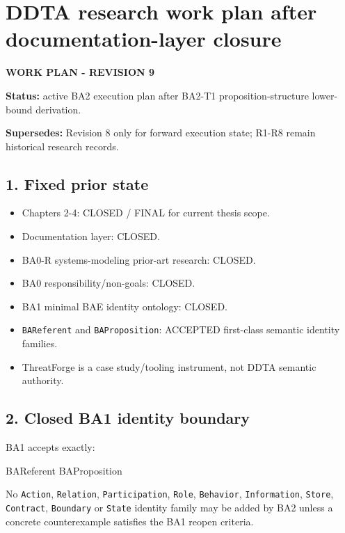 \documentclass[
  10pt,
  letterpaper,
]{article}
\author{}
\date{}
\newenvironment{Shaded}{}{}
\newcommand{\NormalTok}[1]{#1}
\providecommand{\tightlist}{%
  \setlength{\itemsep}{0pt}\setlength{\parskip}{0pt}}
\begin{document}
\section{DDTA research work plan after documentation-layer
closure}\label{ddta-research-work-plan-after-documentation-layer-closure}

\textbf{WORK PLAN - REVISION 9}

\textbf{Status:} active BA2 execution plan after BA2-T1
proposition-structure lower-bound derivation.

\textbf{Supersedes:} Revision 8 only for forward execution state; R1-R8
remain historical research records.

\subsection{1. Fixed prior state}\label{fixed-prior-state}

\begin{itemize}
\tightlist
\item
  Chapters 2-4: CLOSED / FINAL for current thesis scope.
\item
  Documentation layer: CLOSED.
\item
  BA0-R systems-modeling prior-art research: CLOSED.
\item
  BA0 responsibility/non-goals: CLOSED.
\item
  BA1 minimal BAE identity ontology: CLOSED.
\item
  \texttt{BAReferent} and \texttt{BAProposition}: ACCEPTED first-class
  semantic identity families.
\item
  ThreatForge is a case study/tooling instrument, not DDTA semantic
  authority.
\end{itemize}

\subsection{2. Closed BA1 identity
boundary}\label{closed-ba1-identity-boundary}

BA1 accepts exactly:

\begin{Shaded}
\begin{Highlighting}[]
\NormalTok{BAReferent}
\NormalTok{BAProposition}
\end{Highlighting}
\end{Shaded}

No \texttt{Action}, \texttt{Relation}, \texttt{Participation},
\texttt{Role}, \texttt{Behavior}, \texttt{Information}, \texttt{Store},
\texttt{Contract}, \texttt{Boundary} or \texttt{State} identity family
may be added by BA2 unless a concrete counterexample satisfies the BA1
reopen criteria.
\end{document}
